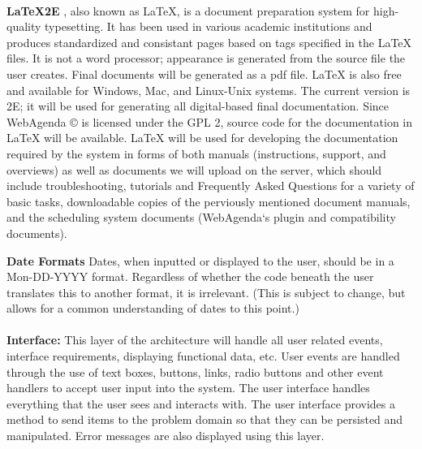 \documentclass[letterpaper,12pt]{report}
\begin{document}
\paragraph{}\hspace{0.6cm}\textbf{LaTeX2E} , also known as LaTeX, is a document preparation system for high-quality typesetting. It has been used in various academic institutions and produces standardized and consistant pages based on tags specified in the LaTeX files. It is not a word processor; appearance is generated from the source file the user creates. Final documents will be generated as a pdf file.
LaTeX is also free and available for Windows, Mac, and Linux-Unix systems. The current version is 2E; it will be used for generating all digital-based final documentation. Since WebAgenda © is licensed under the GPL 2, source code for the documentation in LaTeX will be available.
LaTeX will be used for developing the documentation required by the system in forms of both manuals (instructions, support, and overviews) as well as documents we will upload on the server, which should include troubleshooting, tutorials and Frequently Asked Questions for a variety of basic tasks, downloadable copies of the perviously mentioned document manuals, and the scheduling system documents (WebAgenda`s plugin and compatibility documents).

\textbf{Date Formats}  Dates, when inputted or displayed to the user, should be in a Mon-DD-YYYY format. Regardless of whether the code beneath the user translates this to another format, it is irrelevant. (This is subject to change, but allows for a common understanding of dates to this point.)


\paragraph{}\hspace{0.6cm}\textbf{Interface:} This layer of the architecture will handle all user related events, interface requirements, displaying functional data, etc. User events are handled through the use of text boxes, buttons, links, radio buttons and other event handlers to accept user input into the system. The user interface handles everything that the user sees and interacts with. The user interface provides a method to send items to the problem domain so that they can be persisted and manipulated. Error messages are also displayed using this layer.
\pagebreak
\end{document}
